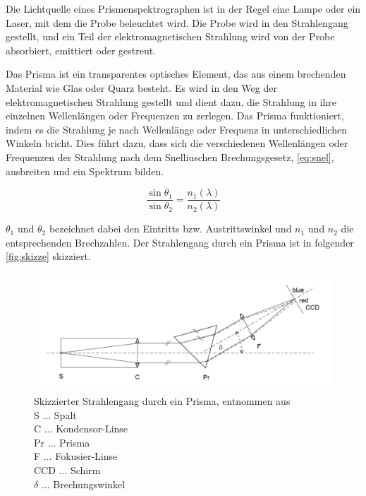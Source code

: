 \documentclass[12pt,english,ngerman]{scrartcl}
\begin{document}
Die Lichtquelle eines Prismenspektrographen ist in der Regel eine Lampe oder ein Laser, mit dem die Probe beleuchtet 
wird. Die Probe wird in den Strahlengang gestellt, und ein Teil der elektromagnetischen Strahlung wird von der Probe 
absorbiert, emittiert oder gestreut.

Das Prisma ist ein transparentes optisches Element, das aus einem brechenden Material wie Glas oder Quarz besteht. Es 
wird in den Weg der elektromagnetischen Strahlung gestellt und dient dazu, die Strahlung in ihre einzelnen Wellenlängen
oder Frequenzen zu zerlegen. Das Prisma funktioniert, indem es die Strahlung je nach Wellenlänge oder Frequenz in 
unterschiedlichen Winkeln bricht. Dies führt dazu, dass sich die verschiedenen Wellenlängen oder Frequenzen der Strahlung 
nach dem Snelliuschen Brechungsgesetz, \autoref{eq:snel}, ausbreiten und ein Spektrum bilden. 

\begin{equation}
	\frac{\sin{\theta_1}}{\sin{\theta_2}} = \frac{n_1(\lambda)}{n_2(\lambda)}
	\label{eq:snel}
\end{equation}

$\theta_1$ und $\theta_2$ bezeichnet dabei den Eintritts bzw. Austrittswinkel und $n_1$ und $n_2$ die entsprechenden Brechzahlen.
Der Strahlengang durch ein Prisma ist in folgender \autoref{fig:skizze} skizziert.


\begin{figure}[H]
	\begin{center}
		\includegraphics[width =\textwidth]{./figures/skizze.png}
	\end{center}
	\caption[Skizzierter Strahlengang durch ein Prisma]
	{Skizzierter Strahlengang durch ein Prisma, entnommen aus \cite{unterlagen} \\
	S \(\dots\) Spalt \\
	C \(\dots\) Kondensor-Linse \\
	Pr \(\dots\) Prisma \\
	F \(\dots\) Fokusier-Linse \\
	CCD \(\dots\) Schirm \\
	$\delta$ \(\dots\) Brechungswinkel
	}\label{fig:skizze}
\end{figure}
\end{document}

